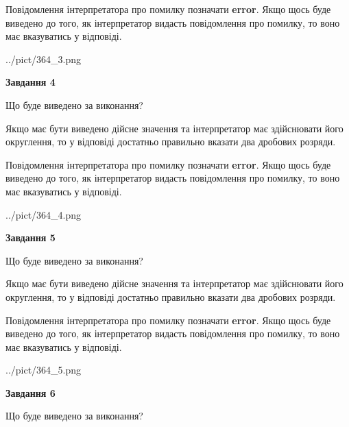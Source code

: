 \documentclass[12pt, ukrainian]{article}
\begin{document}
{\begin {Large}
Повідомлення інтерпретатора про помилку позначати \textbf{error}.
Якщо щось буде виведено до того, як інтерпретатор видасть повідомлення про помилку, 
то воно має вказуватись у відповіді. \par

\begin{center}
	{../pict/364_3.png}
\end{center}
\newpage

{\begin {center}\textbf{Завдання 4}\end {center}}\par
Що буде виведено за виконання? \par

Якщо має бути виведено дійсне значення та інтерпретатор має здійснювати його округлення, 
то у відповіді достатньо правильно вказати два дробових розряди.

Повідомлення інтерпретатора про помилку позначати \textbf{error}.
Якщо щось буде виведено до того, як інтерпретатор видасть повідомлення про помилку, 
то воно має вказуватись у відповіді. \par

\begin{center}
	{../pict/364_4.png}
\end{center}
\newpage

{\begin {center}\textbf{Завдання 5}\end {center}}\par
Що буде виведено за виконання? \par

Якщо має бути виведено дійсне значення та інтерпретатор має здійснювати його округлення, 
то у відповіді достатньо правильно вказати два дробових розряди.

Повідомлення інтерпретатора про помилку позначати \textbf{error}.
Якщо щось буде виведено до того, як інтерпретатор видасть повідомлення про помилку, 
то воно має вказуватись у відповіді. \par

\begin{center}
	{../pict/364_5.png}
\end{center}
\newpage

{\begin {center}\textbf{Завдання 6}\end {center}}\par
Що буде виведено за виконання? \par


\end{Large}}
\end{document}
